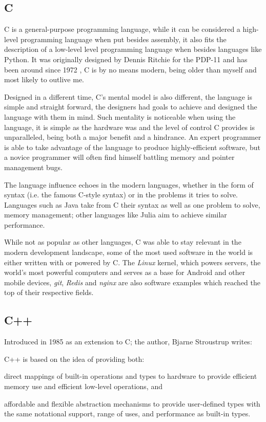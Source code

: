 \subsection{C}
C is a general-purpose programming language, while it can be considered a high-level programming language
when put besides assembly, it also fits the description of a low-level level programming language when besides languages like Python.
It was originally designed by Dennis Ritchie for the PDP-11 and has been around since 1972 \autocite{Ritchie1993, Kernighan1978},
C is by no means modern, being older than myself and most likely to outlive me.

Designed in a different time, C's mental model is also different, the language is simple and straight forward,
the designers had goals to achieve and designed the language with them in mind.
Such mentality is noticeable when using the language,
it is simple as the hardware was and the level of control C provides is unparalleled,
being both a major benefit and a hindrance.
An expert programmer is able to take advantage of the language to produce highly-efficient software,
but a novice programmer will often find himself battling memory and pointer management bugs.

The language influence echoes in the modern languages,
whether in the form of syntax (i.e. the famous C-style syntax) or in the problems it tries to solve.
Languages such as Java take from C their syntax as well as one problem to solve, memory management;
other languages like Julia \autocite{Bezanson2017} aim to achieve similar performance.

While not as popular as other languages, C was able to stay relevant in the modern development landscape,
some of the most used software in the world is either written with or powered by C.
The \emph{Linux} kernel, which powers servers, the world's most powerful computers
and serves as a base for Android and other mobile devices,
\emph{git}, \emph{Redis} and \emph{nginx} are also software examples which reached the top of their respective fields.

\subsection{C++}

Introduced in 1985 as an extension to C; the author, Bjarne Stroustrup writes:

\begin{displayquote}
    C++ is based on the idea of providing both:
    \begin{compactitem}
        \item direct mappings of built-in operations and types to hardware to provide efficient memory use and efficient low-level operations, and
        \item affordable and flexible abstraction mechanisms to provide user-defined types with the same notational support, range of uses, and performance as built-in types.
    \end{compactitem}
\end{displayquote}

